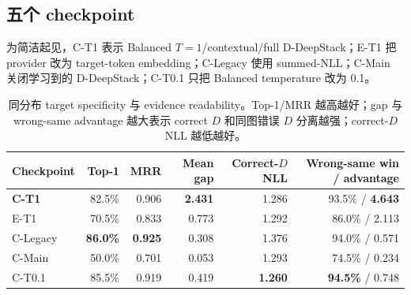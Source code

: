 \documentclass[UTF8,twocolumn,10pt,a4paper]{ctexart}
\begin{document}
\subsection{五个 checkpoint}
为简洁起见，C-T1 表示 Balanced $T=1$/contextual/full D-DeepStack；E-T1 把 provider 改为 target-token embedding；C-Legacy 使用 summed-NLL；C-Main 关闭学习到的 D-DeepStack；C-T0.1 只把 Balanced temperature 改为 0.1。

\begin{table}[t]
\centering
\caption{同分布 target specificity 与 evidence readability。Top-1/MRR 越高越好；gap 与 wrong-same advantage 越大表示 correct $D$ 和同图错误 $D$ 分离越强；correct-$D$ NLL 越低越好。}
\label{tab:retrieval}
\small
\begin{tabular}{lrrrrr}
\toprule
Checkpoint & Top-1 & MRR & Mean gap & Correct-$D$ NLL & Wrong-same win / advantage \\
\midrule
\textbf{C-T1} & 82.5\% & 0.906 & \textbf{2.431} & 1.286 & 93.5\% / \textbf{4.643} \\
E-T1 & 70.5\% & 0.833 & 0.773 & 1.292 & 86.0\% / 2.113 \\
C-Legacy & \textbf{86.0\%} & \textbf{0.925} & 0.308 & 1.376 & 94.0\% / 0.571 \\
C-Main & 50.0\% & 0.701 & 0.053 & 1.293 & 74.5\% / 0.234 \\
C-T0.1 & 85.5\% & 0.919 & 0.419 & \textbf{1.260} & \textbf{94.5\%} / 0.748 \\
\bottomrule
\end{tabular}
\end{table}

\begin{table}[!t]
\centering
\caption{Audited causal grounding。Cross/target continuation 分母分别为 18/72；所有 healthy termination 均不低于 70/72。Presence separation 大于 0 才是期望方向。}
\label{tab:grounding}
\scriptsize
{}
\end{table}
\end{document}

